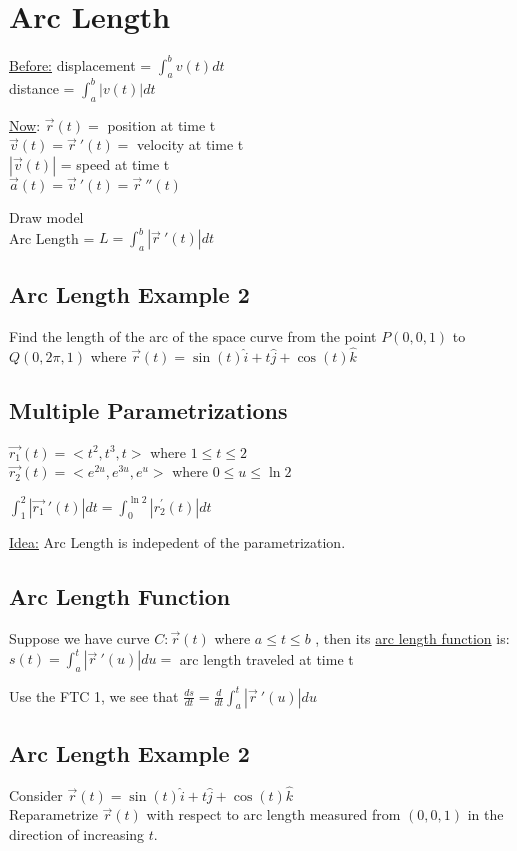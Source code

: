 \documentclass[12pt]{article}
\begin{document}
\section{Arc Length}

\underline{Before:} displacement = \(\int_{a}^{b} v(t)dt\) \\%
distance = \(\int_{a}^{b} |v(t)|dt\)\

\underline{Now}: \(\vec{r} (t) = \) position at time t\\%
\(\vec{v} (t) = \vec{r}\ '(t) =    \) velocity at time t\\%
\(|\vec{v} (t)| \) = speed at time t\\%
\(\vec{a} (t) = \vec{v}\ '(t) = \vec{r}\ ''(t)   \) 

Draw model\\%
Arc Length = \(L =\int_{a}^{b} |\vec{r}\ '(t) |dt\) 

\subsection{Arc Length Example 2}
Find the length of the arc of the space curve from the point \(P(0,0,1)\) to \(Q(0,2\pi,1)\) where \(\vec{r} (t) = \sin(t)\hat{i} + t\hat{j} + \cos(t)\hat{k} \) 

\subsection{Multiple Parametrizations}
\(\vec{r_1} (t) = <t^2,t^3,t>\) where \( 1\leq t\leq 2 \) \\%
\(\vec{r_2} (t) = <e^{2u},e^{3u},e^u>  \) where \(0 \leq u \leq \ln{2}\) 

\(\int_{1}^{2} |\vec{r_1}\ ' (t)| dt = \int_{0}^{\ln{2}} |r^{'}_2(t)|dt\) 

\underline{Idea:} Arc Length is indepedent of the parametrization.

\subsection{Arc Length Function}
Suppose we have curve \(C: \vec{r} (t) \) where \(a\leq t\leq b\)  , then its \underline{arc length function} is:\\%
\(s(t) = \int_{a}^{t} |\vec{r}\ '(u) |du = \) arc length traveled at time t

Use the FTC 1, we see that \(\frac{ds}{dt}= \frac{d}{dt}\int_{a}^{t} |\vec{r}\ '(u) |du\) 

\subsection{Arc Length Example 2}
Consider \(\vec{r} (t) = \sin(t) \hat{i} + t\hat{j} + \cos(t)\hat{k}\) \\%
Reparametrize \(\vec{r} (t) \) with respect to arc length measured from \((0,0,1)\) in the direction of increasing \(t\). 
\end{document}
